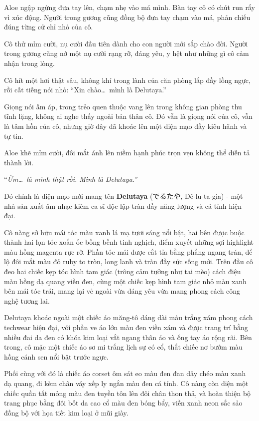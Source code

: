 ﻿\documentclass[../main.tex]{subfiles}
\begin{document}
Aloe ngập ngừng đưa tay lên, chạm nhẹ vào má mình. Bàn tay cô có chút run rẩy vì xúc động. Người trong gương cũng đồng bộ đưa tay chạm vào má, phản chiếu đúng từng cử chỉ nhỏ của cô.

Cô thử mỉm cười, nụ cười đầu tiên dành cho con người mới sắp chào đời. Người trong gương cũng nở một nụ cười rạng rỡ, đáng yêu, y hệt như những gì cô cảm nhận trong lòng.

Cô hít một hơi thật sâu, không khí trong lành của căn phòng lấp đầy lồng ngực, rồi cất tiếng nói nhỏ: ``Xin chào\dots\ mình là Delutaya.''

Giọng nói ấm áp, trong trẻo quen thuộc vang lên trong không gian phòng thu tĩnh lặng, không ai nghe thấy ngoài bản thân cô. Đó vẫn là giọng nói của cô, vẫn là tâm hồn của cô, nhưng giờ đây đã khoác lên một diện mạo đầy kiêu hãnh và tự tin.

Aloe khẽ mỉm cười, đôi mắt ánh lên niềm hạnh phúc trọn vẹn không thể diễn tả thành lời.

``\textit{Ừm\dots\ là mình thật rồi. Mình là Delutaya.''}

\chrint


Đó chính là diện mạo mới mang tên \textbf{Delutaya} (でるたや, Đê-lu-ta-gia) - một nhà sản xuất âm nhạc kiêm ca sĩ độc lập tràn đầy năng lượng và cá tính hiện đại.

Cô nàng sở hữu mái tóc màu xanh lá mạ tươi sáng nổi bật, hai bên được buộc thành hai lọn tóc xoắn ốc bồng bềnh tinh nghịch, điểm xuyết những sợi highlight màu hồng magenta rực rỡ. Phần tóc mái được cắt tỉa bằng phẳng ngang trán, để lộ đôi mắt màu đỏ ruby to tròn, long lanh và tràn đầy sức sống mới. Trên đầu cô đeo hai chiếc kẹp tóc hình tam giác (trông cảm tưởng như tai mèo) cách điệu màu hồng dạ quang viền đen, cùng một chiếc kẹp hình tam giác nhỏ màu xanh bên mái tóc trái, mang lại vẻ ngoài vừa đáng yêu vừa mang phong cách công nghệ tương lai.

Delutaya khoác ngoài một chiếc áo măng-tô dáng dài màu trắng xám phong cách techwear hiện đại, với phần ve áo lớn màu đen viền xám và được trang trí bằng nhiều đai da đen có khóa kim loại vắt ngang thân áo và ống tay áo rộng rãi. Bên trong, cô mặc một chiếc áo sơ mi trắng lịch sự có cổ, thắt chiếc nơ bướm màu hồng cánh sen nổi bật trước ngực.

Phối cùng với đó là chiếc áo corset ôm sát eo màu đen đan dây chéo màu xanh dạ quang, đi kèm chân váy xếp ly ngắn màu đen cá tính. Cô nàng còn diện một chiếc quần tất mỏng màu đen tuyền tôn lên đôi chân thon thả, và hoàn thiện bộ trang phục bằng đôi bốt da cao cổ màu đen bóng bẩy, viền xanh neon sắc sảo đồng bộ với họa tiết kim loại ở mũi giày.
\end{document}
